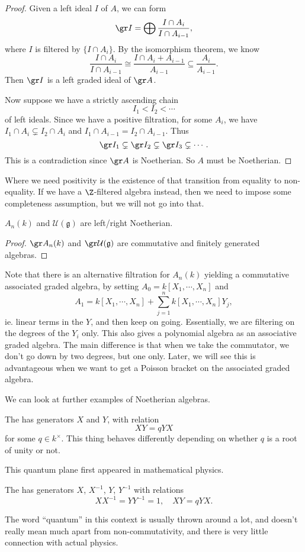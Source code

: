 \documentclass[a4paper]{article}
\begin{document}
\begin{proof}
  Given a left ideal $I$ of $A$, we can form
  \[
    \gr I = \bigoplus \frac{I \cap A_i}{I \cap A_{i - 1}},
  \]
  where $I$ is filtered by $\{I \cap A_i\}$. By the isomorphism theorem, we know
  \[
    \frac{I \cap A_i}{I \cap A_{i - 1}} \cong \frac{I \cap A_i + A_{i - 1}}{A_{i - 1}} \subseteq \frac{A_i}{A_{i - 1}}.
  \]
  Then $\gr I$ is a left graded ideal of $\gr A$.

  Now suppose we have a strictly ascending chain
  \[
    I_1 < I_2 < \cdots
  \]
  of left ideals. Since we have a positive filtration, for some $A_i$, we have $I_1 \cap A_i \subsetneq I_2 \cap A_i$ and $I_1 \cap A_{i - 1} = I_2 \cap A_{i - 1}$. Thus
  \[
    \gr I_1 \subsetneq \gr I_2 \subsetneq \gr I_3 \subsetneq \cdots.
  \]
  This is a contradiction since $\gr A$ is Noetherian. So $A$ must be Noetherian.
\end{proof}
Where we need positivity is the existence of that transition from equality to non-equality. If we have a $\Z$-filtered algebra instead, then we need to impose some completeness assumption, but we will not go into that.

\begin{cor}
  $A_n(k)$ and $\mathcal{U}(\mathfrak{g})$ are left/right Noetherian.
\end{cor}

\begin{proof}
  $\gr A_n(k)$ and $\gr \mathcal{U}(\mathfrak{g})$ are commutative and finitely generated algebras.
\end{proof}

Note that there is an alternative filtration for $A_n(k)$ yielding a commutative associated graded algebra, by setting $A_0 = k[X_1, \cdots, X_n]$ and
\[
  A_1 = k[X_1, \cdots, X_n] + \sum_{j = 1}^n k[X_1, \cdots, X_n] Y_j,
\]
ie. linear terms in the $Y$, and then keep on going. Essentially, we are filtering on the degrees of the $Y_i$ only. This also gives a polynomial algebra as an associative graded algebra. The main difference is that when we take the commutator, we don't go down by two degrees, but one only. Later, we will see this is advantageous when we want to get a Poisson bracket on the associated graded algebra.

We can look at further examples of Noetherian algebras.
\begin{eg}
  The   has generators $X$ and $Y$, with relation
  \[
    XY = q YX
  \]
  for some $q \in k^\times$. This thing behaves differently depending on whether $q$ is a root of unity or not.
\end{eg}
This quantum plane first appeared in mathematical physics.
\begin{eg}
  The   has generators $X$, $X^{-1}$, $Y$, $Y^{-1}$ with relations
  \[
    XX^{-1} = YY^{-1} = 1,\quad XY = q YX.
  \]
\end{eg}
The word ``quantum'' in this context is usually thrown around a lot, and doesn't really mean much apart from non-commutativity, and there is very little connection with actual physics.
\end{document}
